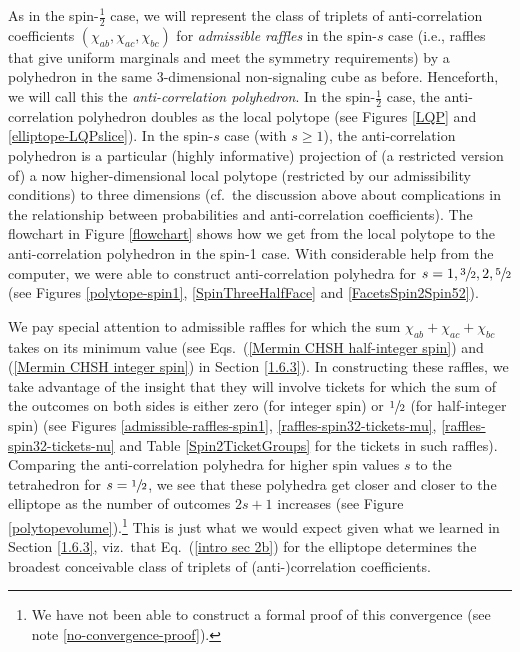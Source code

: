 As in the spin-$\frac12$ case, we will represent the class of triplets of anti-correlation coefficients $(\chi_{ab}, \chi_{ac}, \chi_{bc})$ for \emph{admissible raffles} in the spin-$s$ case (i.e., raffles that give uniform marginals and meet the symmetry requirements) by a polyhedron in the same 3-dimensional non-signaling cube as before. Henceforth, we will call this  the \emph{anti-correlation polyhedron}. In the spin-$\frac12$ case, the anti-correlation polyhedron doubles as the local polytope (see Figures \ref{LQP} and \ref{elliptope-LQPslice}). In the spin-$s$ case (with $s \ge 1$), the anti-correlation polyhedron is a particular (highly informative) projection of (a restricted version of) a now higher-dimensional local polytope (restricted by our admissibility conditions) to three dimensions (cf.\ the discussion above about complications in the relationship between probabilities and anti-correlation coefficients). The flowchart in Figure \ref{flowchart} shows how we get from the local polytope to the anti-correlation polyhedron in the spin-1 case. With considerable help from the computer, we were able to construct anti-correlation polyhedra for $s = 1, \sfrac32,  2, \sfrac52$ (see Figures \ref{polytope-spin1}, \ref{SpinThreeHalfFace} and \ref{FacetsSpin2Spin52}). 

We pay special attention to admissible raffles for which the sum $\chi_{ab} + \chi_{ac} + \chi_{bc}$ takes on its minimum value (see Eqs.\ (\ref{Mermin CHSH half-integer spin}) and (\ref{Mermin CHSH integer spin}) in Section \ref{1.6.3}). In constructing these raffles, we take advantage of the insight that they will involve tickets for which the sum of the outcomes on both sides is either zero (for integer spin) or $\sfrac12$ (for half-integer spin) (see Figures \ref{admissible-raffles-spin1}, \ref{raffles-spin32-tickets-mu}, \ref{raffles-spin32-tickets-nu} and Table \ref{Spin2TicketGroups} for the tickets in such raffles). Comparing the anti-correlation polyhedra for higher spin values $s$  to the tetrahedron for $s = \sfrac12$, we see that these polyhedra get closer and closer to the elliptope as the number of outcomes $2s + 1$ increases (see Figure \ref{polytopevolume}).\footnote{We have not been able to construct a formal proof of this convergence  (see note \ref{no-convergence-proof}).} This is just what we would expect given what we learned in Section \ref{1.6.3}, viz.\ that Eq.\ (\ref{intro sec 2b}) for the elliptope determines the broadest conceivable class of triplets of (anti-)correlation coefficients.
